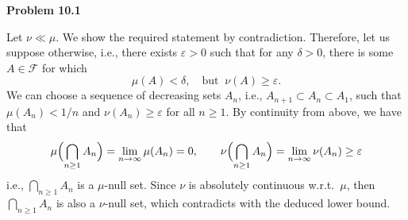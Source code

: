 \documentclass{lecturenotes}
\begin{document}
\textbf{Problem 10.1}

Let $\nu\ll \mu$. We show the required statement by contradiction. Therefore, let us suppose otherwise, i.e., there exists $\varepsilon>0$ such that for any $\delta>0$, there is some $A\in\mathcal{F}$ for which
\[
	\mu(A)<\delta,\quad\text{but}\;\;\nu(A)\ge \varepsilon.
\]
We can choose a sequence of decreasing sets $A_n$, i.e., $A_{n+1}\subset A_n\subset A_1$, such that $\mu(A_n)<1/n$ and $\nu(A_n)\ge \varepsilon$ for all $n\ge 1$. By continuity from above, we have that
\[
	\mu\Bigl(\bigcap_{n\ge 1} A_n\Bigr) = \lim_{n\to\infty} \mu(A_n) = 0,\qquad \nu\Bigl(\bigcap_{n\ge 1} A_n\Bigr) = \lim_{n\to\infty} \nu(A_n) \ge \varepsilon
\]
i.e., $\bigcap_{n\ge 1} A_n$ is a $\mu$-null set. Since $\nu$ is absolutely continuous w.r.t.\ $\mu$, then $\bigcap_{n\ge 1} A_n$ is also a $\nu$-null set, which contradicts with the deduced lower bound.
\end{document}
